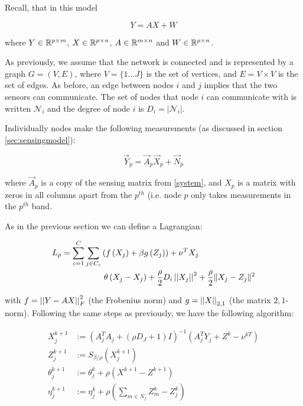 Recall, that in this model 

\begin{equation}
Y = AX + W
\end{equation}

where \(Y \in {\mathbb{R}}^{p \times m}\), \(X \in {\mathbb{R}}^{p\times n}\), \(A \in {\mathbb{R}}^{m \times n}\) and \(W \in {\mathbb{R}}^{p\times n}\).

As previously, we assume that the network is connected and is represented by a graph \(G = \left(V,E\right)\), where \(V = \{1 \ldots J\}\) is the set of vertices, and \(E = V \times V\) is the set of edges. As before, an edge between nodes \(i\) and \(j\) implies that the two sensors can communicate. The set of nodes that node \(i\) can communicate with is written \(\mathcal{N}_i\) and the degree of node \(i\) is \(D_i = |\mathcal{N}_i|\). 

Individually nodes make the following measurements (as discussed in section \ref{sec:sensingmodel}):

\begin{equation}
\vec{Y}_p = \vec{A}_p\vec{X}_p + \vec{N}_p
\end{equation}

where \(\vec{A}_p\) is a copy of the sensing matrix from \eqref{system}, and \(X_p\) is a matrix with zeros in all columns apart from the \(p^{th}\) (i.e. node \(p\) only takes measurements in the \(p^{th}\) band.

As in the previous section we can define a Lagrangian:

\begin{align}
L_\rho = \sum_{c=1}^C\sum_{j \in C_c} &\left( f\left(X_j\right) + \beta g\left(Z_j\right)\right) + \nu^TX_j \nonumber \\
& \text{        } \theta\left(X_j - X_j\right) + \frac{\rho}{2}D_i\left|\left|X_j\right|\right|^2 + \frac{\rho }{2}\|X_j-Z_j\|^2
\label{generic-iterations}
\end{align}

with \(f = \left|\left|Y - AX\right|\right|_F^2\) (the Frobenius norm) and \(g = \left|\left|X\right|\right|_{2,1}\) (the matrix \(2,1\)-norm). Following the same steps as previously, we have the following algorithm:

\begin{align}
X_j^{k+1} &:= \left(A_j^TA_j + (\rho D_J + 1) I\right)^{-1}\left(A_j^TY_j +  Z^k - \nu^{kT}\right)\\
Z_j^{k+1} &:= S_{\beta/\rho}\left(X_j^{k+1} \right)
 \\
\theta_j^{k+1} &:= \theta_j^{k} + \rho \left(X^{k+1}-Z^{k+1}\right) \\
\eta_j^{k+1} &:= \eta_j^k + \rho\left(\sum_{m \in N_j} Z_m^k - Z_j^k\right)
\label{dadmm_algo_mmv}
\end{align}

